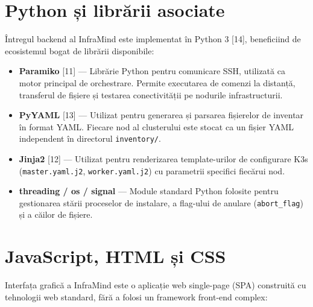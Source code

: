 \documentclass[12pt,a4paper]{report}
\begin{document}
\section{Python și librării asociate}

Întregul backend al InfraMind este implementat în Python 3 [14], beneficiind de ecosistemul bogat de librării disponibile:

\begin{itemize}
  \item \textbf{Paramiko} [11] — Librărie Python pentru comunicare SSH, utilizată ca motor principal de orchestrare. Permite executarea de comenzi la distanță, transferul de fișiere și testarea conectivității pe nodurile infrastructurii.
  \item \textbf{PyYAML} [13] — Utilizat pentru generarea și parsarea fișierelor de inventar în format YAML. Fiecare nod al clusterului este stocat ca un fișier YAML independent în directorul \texttt{inventory/}.
  \item \textbf{Jinja2} [12] — Utilizat pentru renderizarea template-urilor de configurare K3s (\texttt{master.yaml.j2}, \texttt{worker.yaml.j2}) cu parametrii specifici fiecărui nod.
  \item \textbf{threading / os / signal} — Module standard Python folosite pentru gestionarea stării proceselor de instalare, a flag-ului de anulare (\texttt{abort\_flag}) și a căilor de fișiere.
\end{itemize}

\section{JavaScript, HTML și CSS}

Interfața grafică a InfraMind este o aplicație web single-page (SPA) construită cu tehnologii web standard, fără a folosi un framework front-end complex:
\end{document}
